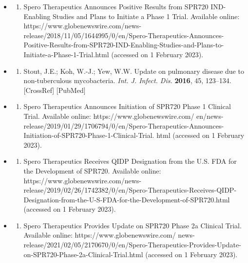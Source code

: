 \documentclass{article}
\begin{document}
\begin{itemize}
\begin{enumerate}
\end{enumerate}

\item \begin{enumerate}
\item 
Spero Therapeutics Announces Positive Results from SPR720 IND-Enabling Studies and Plans to Initiate a Phase 1 Trial. Available online: https://www.globenewswire.com/news-release/2018/11/05/1644995/0/en/Spero-Therapeutics-Announces-Positive-Results-from-SPR720-IND-Enabling-Studies-and-Plans-to-Initiate-a-Phase-1-Trial.html (accessed on 1 February 2023).

\end{enumerate}

\item \begin{enumerate}
\item 
Stout, J.E.; Koh, W.-J.; Yew, W.W. Update on pulmonary disease due to non-tuberculous mycobacteria. \textit{Int. J. Infect. Dis.} \textbf{2016}, 45, 123–134. [CrossRef] [PubMed]

\end{enumerate}

\item \begin{enumerate}
\item 
Spero Therapeutics Announces Initiation of SPR720 Phase 1 Clinical Trial. Available online: https://www.globenewswire.com/ en/news-release/2019/01/29/1706794/0/en/Spero-Therapeutics-Announces-Initiation-of-SPR720-Phase-1-Clinical-Trial. html (accessed on 1 February 2023).

\end{enumerate}

\item \begin{enumerate}
\item 
Spero Therapeutics Receives QIDP Designation from the U.S. FDA for the Development of SPR720. Available online: https://www.globenewswire.com/news-release/2019/02/26/1742382/0/en/Spero-Therapeutics-Receives-QIDP-Designation-from-the-U-S-FDA-for-the-Development-of-SPR720.html (accessed on 1 February 2023).

\end{enumerate}

\item \begin{enumerate}
\item 
Spero Therapeutics Provides Update on SPR720 Phase 2a Clinical Trial. Available online: https://www.globenewswire.com/ news-release/2021/02/05/2170670/0/en/Spero-Therapeutics-Provides-Update-on-SPR720-Phase-2a-Clinical-Trial.html (accessed on 1 February 2023).


\end{enumerate}
\end{itemize}
\end{document}
